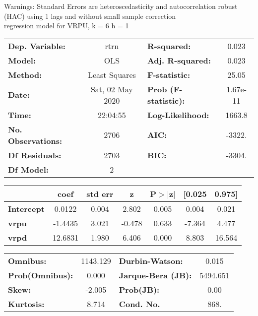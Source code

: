 Warnings: \newline
 [1] Standard Errors are heteroscedasticity and autocorrelation robust (HAC) using 1 lags and without small sample correction\\ 

regression model for VRPU, k = 6 h = 1\begin{center}
\begin{tabular}{lclc}
\toprule
\textbf{Dep. Variable:}    &       rtrn       & \textbf{  R-squared:         } &     0.023   \\
\textbf{Model:}            &       OLS        & \textbf{  Adj. R-squared:    } &     0.023   \\
\textbf{Method:}           &  Least Squares   & \textbf{  F-statistic:       } &     25.05   \\
\textbf{Date:}             & Sat, 02 May 2020 & \textbf{  Prob (F-statistic):} &  1.67e-11   \\
\textbf{Time:}             &     22:04:55     & \textbf{  Log-Likelihood:    } &    1663.8   \\
\textbf{No. Observations:} &        2706      & \textbf{  AIC:               } &    -3322.   \\
\textbf{Df Residuals:}     &        2703      & \textbf{  BIC:               } &    -3304.   \\
\textbf{Df Model:}         &           2      & \textbf{                     } &             \\
\bottomrule
\end{tabular}
\begin{tabular}{lcccccc}
                   & \textbf{coef} & \textbf{std err} & \textbf{z} & \textbf{P$> |$z$|$} & \textbf{[0.025} & \textbf{0.975]}  \\
\midrule
\textbf{Intercept} &       0.0122  &        0.004     &     2.802  &         0.005        &        0.004    &        0.021     \\
\textbf{vrpu}      &      -1.4435  &        3.021     &    -0.478  &         0.633        &       -7.364    &        4.477     \\
\textbf{vrpd}      &      12.6831  &        1.980     &     6.406  &         0.000        &        8.803    &       16.564     \\
\bottomrule
\end{tabular}
\begin{tabular}{lclc}
\textbf{Omnibus:}       & 1143.129 & \textbf{  Durbin-Watson:     } &    0.015  \\
\textbf{Prob(Omnibus):} &   0.000  & \textbf{  Jarque-Bera (JB):  } & 5494.651  \\
\textbf{Skew:}          &  -2.005  & \textbf{  Prob(JB):          } &     0.00  \\
\textbf{Kurtosis:}      &   8.714  & \textbf{  Cond. No.          } &     868.  \\
\bottomrule
\end{tabular}
\end{center}

